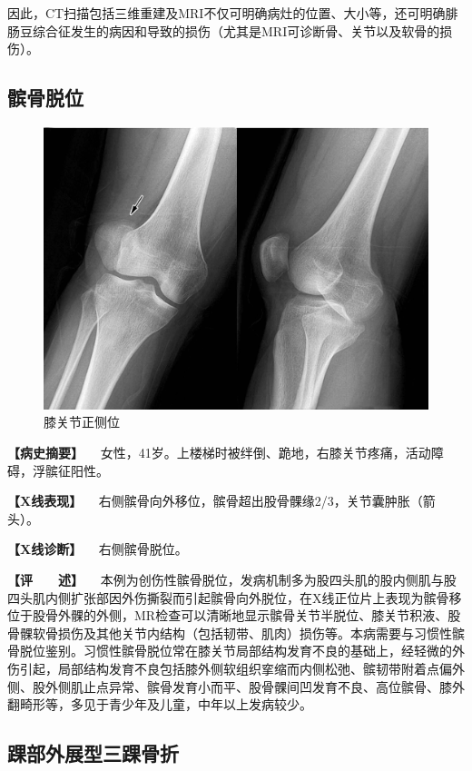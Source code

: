 因此，CT扫描包括三维重建及MRI不仅可明确病灶的位置、大小等，还可明确腓肠豆综合征发生的病因和导致的损伤（尤其是MRI可诊断骨、关节以及软骨的损伤）。

\subsection{髌骨脱位}

\begin{figure}[!htbp]
 \centering
 \includegraphics{./images/Image00054.jpg}
 \captionsetup{justification=centering}
 \caption{膝关节正侧位}
 \label{fig2-3-27}
  \end{figure} 

\textbf{【病史摘要】}
　女性，41岁。上楼梯时被绊倒、跪地，右膝关节疼痛，活动障碍，浮髌征阳性。

\textbf{【X线表现】}
　右侧髌骨向外移位，髌骨超出股骨髁缘2/3，关节囊肿胀（箭头）。

\textbf{【X线诊断】} 　右侧髌骨脱位。

\textbf{【评　　述】}
　本例为创伤性髌骨脱位，发病机制多为股四头肌的股内侧肌与股四头肌内侧扩张部因外伤撕裂而引起髌骨向外脱位，在X线正位片上表现为髌骨移位于股骨外髁的外侧，MR检查可以清晰地显示髌骨关节半脱位、膝关节积液、股骨髁软骨损伤及其他关节内结构（包括韧带、肌肉）损伤等。本病需要与习惯性髌骨脱位鉴别。习惯性髌骨脱位常在膝关节局部结构发育不良的基础上，经轻微的外伤引起，局部结构发育不良包括膝外侧软组织挛缩而内侧松弛、髌韧带附着点偏外侧、股外侧肌止点异常、髌骨发育小而平、股骨髁间凹发育不良、高位髌骨、膝外翻畸形等，多见于青少年及儿童，中年以上发病较少。

\subsection{踝部外展型三踝骨折}

